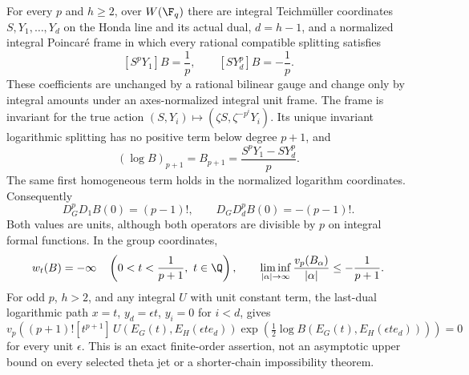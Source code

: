 \begin{theorem}\label{DP38}
For every $p$ and $h\ge2$, over $W(\F_q)$ there are integral Teichm\"uller coordinates $S,Y_1,\ldots,Y_d$ on the Honda line and its actual dual, $d=h-1$, and a normalized integral Poincar\'e frame in which every rational compatible splitting satisfies
\[
 [S^pY_1]B=\frac1p,\qquad [SY_d^p]B=-\frac1p.
\]
These coefficients are unchanged by a rational bilinear gauge and change only by integral amounts under an axes-normalized integral unit frame. The frame is invariant for the true action $(S,Y_i)\mapsto(\zeta S,\zeta^{-p^i}Y_i)$. Its unique invariant logarithmic splitting has no positive term below degree $p+1$, and
\begin{equation}\label{eq:primitive-first}
 (\log B)_{p+1}=B_{p+1}=\frac{S^pY_1-SY_d^p}{p}.
\end{equation}
The same first homogeneous term holds in the normalized logarithm coordinates. Consequently
\[
 D_G^pD_1 B(0)=(p-1)!,\qquad D_GD_d^p B(0)=-(p-1)!.
\]
Both values are units, although both operators are divisible by $p$ on integral formal functions. In the group coordinates,
\[
 w_t(B)=-\infty\quad\left(0<t<\frac1{p+1},\ t\in\Q\right),\qquad
 \liminf_{|\alpha|\to\infty}\frac{v_p(B_\alpha)}{|\alpha|}\le-\frac1{p+1}.
\]
For odd $p$, $h>2$, and any integral $U$ with unit constant term, the last-dual logarithmic path $x=t$, $y_d=\epsilon t$, $y_i=0$ for $i<d$, gives
\begin{equation}\label{eq:primitive-path-unit}
 v_p\left((p+1)![t^{p+1}]\,
 U(E_G(t),E_H(\epsilon te_d))
 \exp\left(\tfrac12\log B(E_G(t),E_H(\epsilon te_d))\right)\right)=0
\end{equation}
for every unit $\epsilon$. This is an exact finite-order assertion, not an asymptotic upper bound on every selected theta jet or a shorter-chain impossibility theorem.
\end{theorem}
